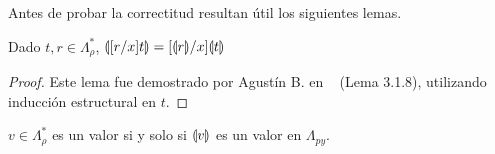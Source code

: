 Antes de probar la correctitud resultan útil los siguientes lemas.
\begin{lema}[Sustitución]
\label{lem:subst}
Dado $t, r \in \Lambda_\rho^*$, $\llparenthesis [r/x]t \rrparenthesis=[\llparenthesis r \rrparenthesis/x]\llparenthesis t \rrparenthesis$
\end{lema}
\begin{proof}
Este lema fue demostrado por Agustín B. en ~\cite{agustin} (Lema 3.1.8), utilizando inducción estructural en $t$.
\end{proof}

\begin{lema}
\label{lem:valor}
$v \in \Lambda_\rho^*$ es un valor si y solo si $\llparenthesis v \rrparenthesis$ es un valor en $\Lambda_\textit{py}$.
\end{lema}

